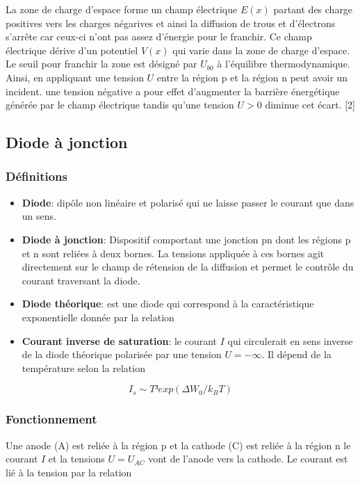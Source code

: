 \documentclass{article}
\begin{document}
            La zone de charge d'espace forme un champ électrique $E(x)$ partant des charge positives vers les charges négarives et ainsi la diffusion de trous et d'électrons s'arrête car ceux-ci n'ont pas assez d'énergie pour le franchir. Ce champ électrique dérive d'un potentiel $V(x)$ qui varie dans la zone de charge d'espace. Le seuil pour franchir la zone est désigné par $U_{b0}$ à l'équilibre thermodynamique. Ainsi, en appliquant une tension $U$ entre la région p et la région n peut avoir un incident. une tension négative a pour effet d'augmenter la barrière énergétique générée par le champ électrique tandis qu'une tension $U > 0$ diminue cet écart. [2]

            \subsection{Diode à jonction}

                \subsubsection{Définitions}
                    \begin{itemize}
                        \item \textbf{Diode}: dipôle non linéaire et polarisé qui ne laisse passer le courant que dans un sens.
                        \item \textbf{Diode à jonction}: Dispositif comportant une jonction pn dont les régions p et n sont reliées à deux bornes. La tensions appliquée à ces bornes agit directement sur le champ de rétension de la diffusion et permet le contrôle du courant traversant la diode.
                        \item \textbf{Diode théorique}: est une diode qui correspond à la caractéristique exponentielle donnée par la relation 
                        \item \textbf{Courant inverse de saturation}: le courant $I$ qui circulerait en sens inverse de la diode théorique polarisée par une tension $U =-\infty$. Il dépend de la température selon la relation
                    \end{itemize}


                        \begin{equation}
                            I_s \sim T³exp(\Delta W_0/k_BT)
                        \end{equation}
        
                \subsubsection{Fonctionnement}
                    Une anode (A) est reliée à la région p et la cathode (C) est reliée à la région n le courant $I$ et la tensions $U= U_{AC}$ vont de l'anode vers la cathode. Le courant est lié à la tension par la relation 
\end{document}
